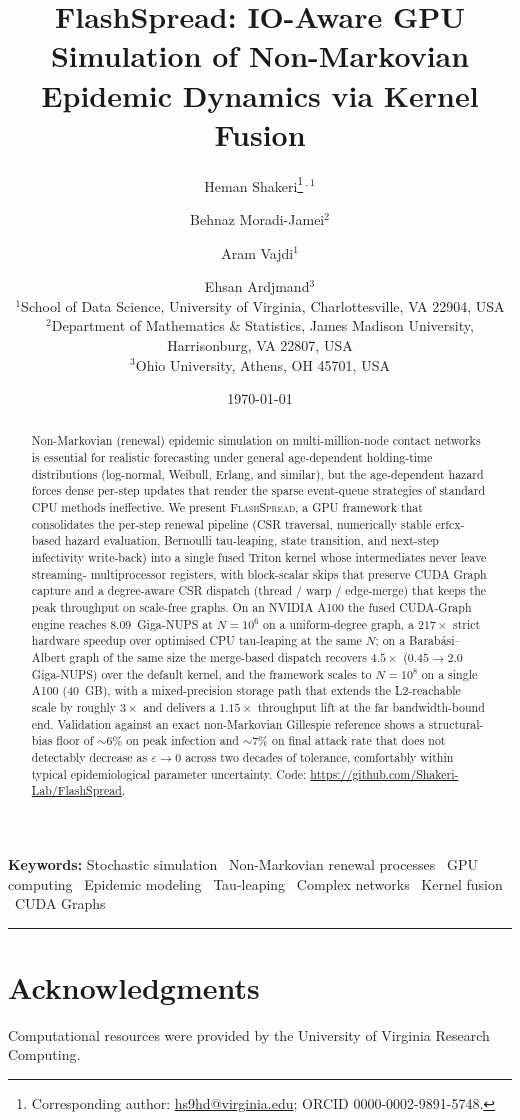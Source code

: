 \documentclass[11pt]{article}
\title{%
  FlashSpread: IO-Aware GPU Simulation of Non-Markovian Epidemic
  Dynamics via Kernel Fusion
}
\author{%
  Heman Shakeri\thanks{Corresponding author:
  \href{mailto:hs9hd@virginia.edu}{hs9hd@virginia.edu}; ORCID
  0000-0002-9891-5748.}\,$^{,1}$
  \and Behnaz Moradi-Jamei$^{2}$
  \and Aram Vajdi$^{1}$
  \and Ehsan Ardjmand$^{3}$ \\[6pt]
  \footnotesize $^{1}$School of Data Science, University of Virginia,
  Charlottesville, VA 22904, USA \\
  \footnotesize $^{2}$Department of Mathematics \& Statistics,
  James Madison University, Harrisonburg, VA 22807, USA \\
  \footnotesize $^{3}$Ohio University, Athens, OH 45701, USA
}
\date{\today}
\theoremstyle{plain}
\theoremstyle{definition}
\theoremstyle{remark}
\newcommand{\flashspread}{\textsc{FlashSpread}}
\begin{document}
\maketitle

\begin{abstract}
\noindent
Non-Markovian (renewal) epidemic simulation on multi-million-node
contact networks is essential for realistic forecasting under general
age-dependent holding-time distributions (log-normal, Weibull, Erlang,
and similar), but the age-dependent hazard forces dense per-step
updates that render the sparse event-queue strategies of standard CPU
methods ineffective. We present \flashspread{}, a GPU framework that
consolidates the per-step renewal pipeline (CSR traversal, numerically
stable $\mathrm{erfcx}$-based hazard evaluation, Bernoulli tau-leaping,
state transition, and next-step infectivity write-back) into a single
fused Triton kernel whose intermediates never leave streaming-
multiprocessor registers, with block-scalar skips that preserve CUDA
Graph capture and a degree-aware CSR dispatch (thread / warp /
edge-merge) that keeps the peak throughput on scale-free graphs. On an
NVIDIA A100 the fused CUDA-Graph engine reaches 8.09~Giga-NUPS at
$N = 10^6$ on a uniform-degree graph, a $217\times$ strict hardware
speedup over optimised CPU tau-leaping at the same $N$; on a
Barab\'{a}si--Albert graph of the same size the merge-based dispatch
recovers $4.5\times$ ($0.45 \to 2.0$ Giga-NUPS) over the default
kernel, and the framework scales to $N = 10^8$ on a single A100
(40~GB), with a mixed-precision storage path that extends the
L2-reachable scale by roughly $3\times$ and delivers a $1.15\times$
throughput lift at the far bandwidth-bound end. Validation against an
exact non-Markovian Gillespie reference shows a structural-bias floor
of $\sim$6\% on peak infection and $\sim$7\% on final attack rate that
does not detectably decrease as $\varepsilon \to 0$ across two decades
of tolerance, comfortably within typical epidemiological parameter
uncertainty. Code: \url{https://github.com/Shakeri-Lab/FlashSpread}.
\end{abstract}

\noindent\textbf{Keywords:} Stochastic simulation \textperiodcentered\
Non-Markovian renewal processes \textperiodcentered\ GPU computing
\textperiodcentered\ Epidemic modeling \textperiodcentered\ Tau-leaping
\textperiodcentered\ Complex networks \textperiodcentered\ Kernel
fusion \textperiodcentered\ CUDA Graphs

\bigskip\hrule\bigskip



\section*{Acknowledgments}

Computational resources were provided by the University of Virginia
Research Computing.

\appendix



\end{document}

